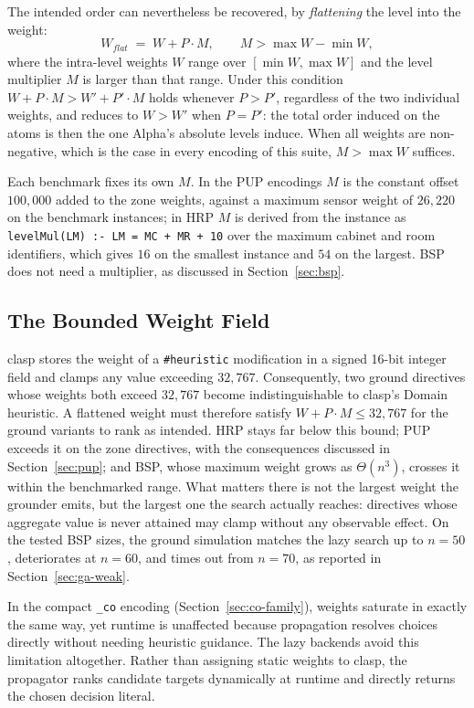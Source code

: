 The intended order can nevertheless be recovered, by \emph{flattening} the level into the weight:
\[
W_{\mathit{flat}} \;=\; W + P \cdot M,
\qquad M > \max W - \min W,
\]
where the intra-level weights $W$ range over $[\min W, \max W]$ and the level multiplier $M$ is larger than that range. Under this condition $W + P\cdot M > W' + P'\cdot M$ holds whenever $P > P'$, regardless of the two individual weights, and reduces to $W > W'$ when $P = P'$: the total order induced on the atoms is then the one Alpha's absolute levels induce. When all weights are non-negative, which is the case in every encoding of this suite, $M > \max W$ suffices.

Each benchmark fixes its own $M$. In the PUP encodings $M$ is the constant offset $100{,}000$ added to the zone weights, against a maximum sensor weight of $26{,}220$ on the benchmark instances; in HRP $M$ is derived from the instance as \texttt{levelMul(LM) :- LM = MC + MR + 10} over the maximum cabinet and room identifiers, which gives $16$ on the smallest instance and $54$ on the largest. BSP does not need a multiplier, as discussed in Section~\ref{sec:bsp}.

\subsection{The Bounded Weight Field}
\label{sec:weight-problem}
clasp stores the weight of a \texttt{\#heuristic} modification in a signed 16-bit integer field and clamps any value exceeding $32{,}767$. Consequently, two ground directives whose weights both exceed $32{,}767$ become indistinguishable to clasp's Domain heuristic. A flattened weight must therefore satisfy $W + P\cdot M \le 32{,}767$ for the ground variants to rank as intended. 
HRP stays far below this bound; PUP exceeds it on the zone directives, with the consequences discussed in Section~\ref{sec:pup}; and BSP, whose maximum weight grows as $\Theta(n^{3})$, crosses it within the benchmarked range. What matters there is not the largest weight the grounder emits, but the largest one the search actually reaches: directives whose aggregate value is never attained may clamp without any observable effect. On the tested BSP sizes, the ground simulation matches the lazy search up to $n=50$, deteriorates at $n=60$, and times out from $n=70$, as reported in Section~\ref{sec:ga-weak}. 

In the compact \texttt{\_co} encoding (Section~\ref{sec:co-family}), weights saturate in exactly the same way, yet runtime is unaffected because propagation resolves choices directly without needing heuristic guidance.
The lazy backends avoid this limitation altogether. Rather than assigning static weights to clasp, the propagator ranks candidate targets dynamically at runtime and directly returns the chosen decision literal.

